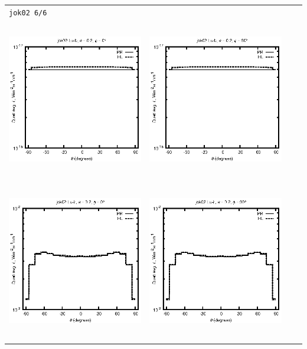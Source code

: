 \documentclass[10pt,a4paper]{article}
\begin{document}
\begin{adjustwidth}{-1.2in}{-1.2in}
\begin{tabular}{c c c c}
\multicolumn{4}{l}{\texttt{jok02 6/6}} \\
\includegraphics[height=7cm]{../eps/jok02_Lu_b_fwd.eps} &
\includegraphics[height=7cm]{../eps/jok02_Lu_b_cross.eps} \\
\includegraphics[height=7cm]{../eps/jok02_Lu_it_fwd.eps} &
\includegraphics[height=7cm]{../eps/jok02_Lu_it_cross.eps} \\

\end{tabular}
\end{adjustwidth}
\end{document}
